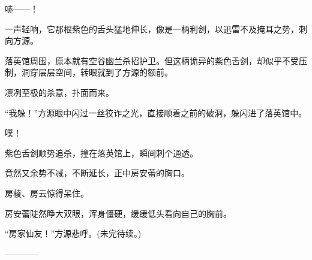 \begin{this_body}
哧――！

一声轻响，它那根紫色的舌头猛地伸长，像是一柄利剑，以迅雷不及掩耳之势，刺向方源。

落英馆周围，原本就有空谷幽兰杀招护卫。但这柄诡异的紫色舌剑，却似乎不受压制，洞穿层层空间，转眼就到了方源的额前。

凛冽至极的杀意，扑面而来。

“我躲！”方源眼中闪过一丝狡诈之光，直接顺着之前的破洞，躲闪进了落英馆中。

噗！

紫色舌剑顺势追杀，撞在落英馆上，瞬间刺个通透。

竟然又余势不减，不断延长，正中房安蕾的胸口。

房棱、房云惊得呆住。

房安蕾陡然睁大双眼，浑身僵硬，缓缓低头看向自己的胸前。

“房家仙友！”方源悲呼。(未完待续。)

------------

\end{this_body}

